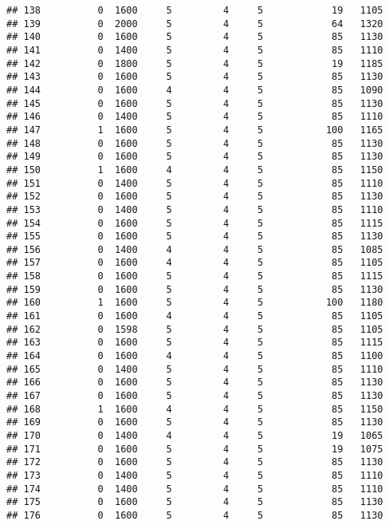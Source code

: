 \documentclass[]{article}
\begin{document}
\begin{verbatim}
## 138          0  1600     5         4     5            19   1105
## 139          0  2000     5         4     5            64   1320
## 140          0  1600     5         4     5            85   1130
## 141          0  1400     5         4     5            85   1110
## 142          0  1800     5         4     5            19   1185
## 143          0  1600     5         4     5            85   1130
## 144          0  1600     4         4     5            85   1090
## 145          0  1600     5         4     5            85   1130
## 146          0  1400     5         4     5            85   1110
## 147          1  1600     5         4     5           100   1165
## 148          0  1600     5         4     5            85   1130
## 149          0  1600     5         4     5            85   1130
## 150          1  1600     4         4     5            85   1150
## 151          0  1400     5         4     5            85   1110
## 152          0  1600     5         4     5            85   1130
## 153          0  1400     5         4     5            85   1110
## 154          0  1600     5         4     5            85   1115
## 155          0  1600     5         4     5            85   1130
## 156          0  1400     4         4     5            85   1085
## 157          0  1600     4         4     5            85   1105
## 158          0  1600     5         4     5            85   1115
## 159          0  1600     5         4     5            85   1130
## 160          1  1600     5         4     5           100   1180
## 161          0  1600     4         4     5            85   1105
## 162          0  1598     5         4     5            85   1105
## 163          0  1600     5         4     5            85   1115
## 164          0  1600     4         4     5            85   1100
## 165          0  1400     5         4     5            85   1110
## 166          0  1600     5         4     5            85   1130
## 167          0  1600     5         4     5            85   1130
## 168          1  1600     4         4     5            85   1150
## 169          0  1600     5         4     5            85   1130
## 170          0  1400     4         4     5            19   1065
## 171          0  1600     5         4     5            19   1075
## 172          0  1600     5         4     5            85   1130
## 173          0  1400     5         4     5            85   1110
## 174          0  1400     5         4     5            85   1110
## 175          0  1600     5         4     5            85   1130
## 176          0  1600     5         4     5            85   1130

\end{verbatim}
\end{document}
